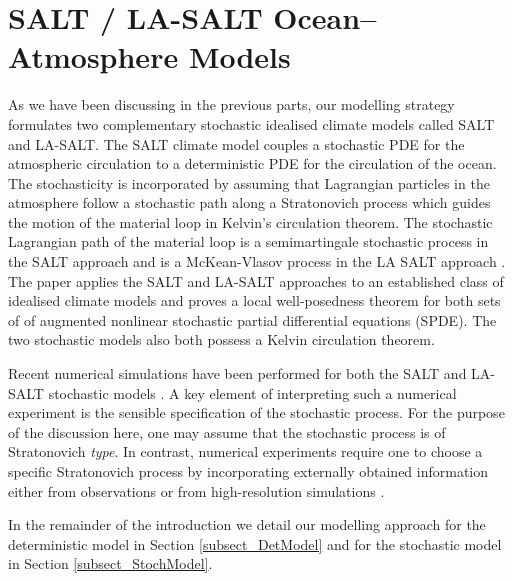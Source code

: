 \documentclass[11pt, oneside]{article}   	%
\numberwithin{equation}{section}
\theoremstyle{plain}
\theoremstyle{definition}
\theoremstyle{remark}
\newcommand{\<}{\langle}
\renewcommand{\>}{\rangle}
\begin{document}

\part{SALT / LA-SALT Ocean--Atmosphere Models} 

As we have been discussing in the previous parts, our modelling strategy formulates two complementary stochastic idealised climate models called SALT and LA-SALT. The SALT climate model couples a stochastic PDE for the atmospheric circulation to a deterministic PDE for the circulation of the ocean. The stochasticity is incorporated by assuming that Lagrangian particles in the atmosphere follow a stochastic path along a Stratonovich process which guides the motion of the material loop in Kelvin's circulation theorem. The stochastic Lagrangian path of the material loop is a semimartingale stochastic process in the SALT approach and is a McKean-Vlasov  process in the LA SALT approach \cite{McKean}. The paper \cite{crisan2023implementation} applies the SALT and LA-SALT approaches to an established class of idealised climate models and proves a local well-posedness theorem for both sets of of augmented nonlinear stochastic partial differential equations (SPDE). The two stochastic models also both possess a Kelvin circulation theorem. 

Recent numerical simulations have been performed for both the SALT and LA-SALT stochastic models \cite{sharma2026structure}. A key element of interpreting such a numerical experiment is the sensible specification of the stochastic process. For the purpose of the discussion here, one may assume that the stochastic process is of Stratonovich \emph{type}. In contrast, numerical experiments require one to choose a specific Stratonovich process by incorporating externally obtained information either from observations or from high-resolution simulations \cite{sharma2026structure}. 

\color{black}

\bigskip

 In the remainder of the introduction we detail our modelling approach for the deterministic model in Section \ref{subsect_DetModel} and for the stochastic 
 model in Section \ref{subsect_StochModel}.   

\end{document}
